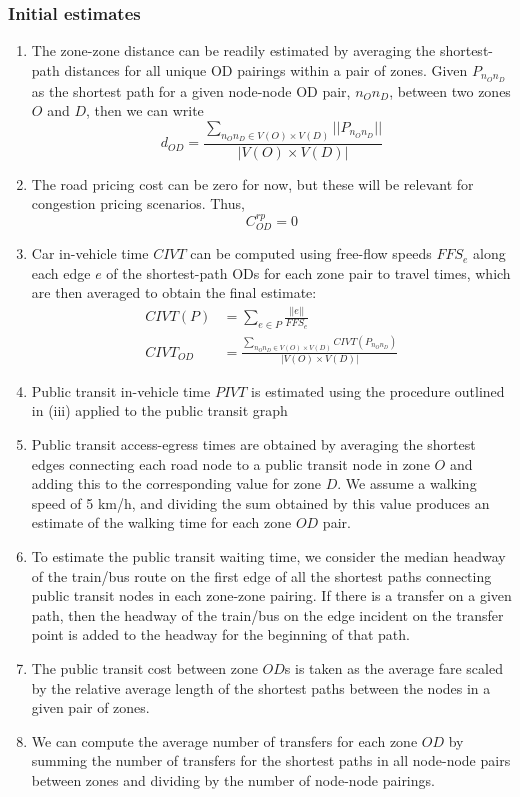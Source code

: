 \documentclass[11pt,twoside]{article}
\numberwithin{equation}{section}
\newcommand{\?}{\stackrel{?}{=}}
\newcommand{\fr}{\frac}
\begin{document}
\subsubsection{Initial estimates}
\begin{enumerate}
\item The zone-zone distance can be readily estimated by averaging the shortest-path distances for all unique OD pairings within a pair of zones. Given $P_{n_O n_D}$ as the shortest path for a given node-node OD pair, $n_On_D$, between two zones $O$ and $D$, then we can write
  \begin{equation}
    d_{OD} = \frac{\sum_{n_On_D \in V(O) \times V(D)}|| P_{n_On_D}||}{|V(O) \times V(D)|}
  \end{equation}
\item The road pricing cost can be zero for now, but these will be relevant for congestion pricing scenarios. Thus,
  \begin{equation}
    C^{rp}_{OD} = 0
  \end{equation}
\item Car in-vehicle time $CIVT$ can be computed using free-flow speeds $FFS_e$ along each edge $e$ of the shortest-path ODs for each zone pair to travel times, which are then averaged to obtain the final estimate:
  \begin{align}
    CIVT(P) &= \sum_{e \in P} \fr{||e||}{FFS_e}\\
    CIVT_{OD} &= \frac{\sum_{n_On_D \in V(O) \times V(D)} CIVT(P_{n_On_D})}{|V(O) \times V(D)|}
  \end{align}
\item Public transit in-vehicle time $PIVT$ is estimated using the procedure outlined in (iii) applied to the public transit graph
\item Public transit access-egress times are obtained by averaging the shortest edges connecting each road node to a public transit node in zone $O$ and adding this to the corresponding value for zone $D$. We assume a walking speed of 5 km/h, and dividing the sum obtained by this value produces an estimate of the walking time for each zone $OD$ pair.

\item To estimate the public transit waiting time, we consider the median headway of the train/bus route on the first edge of all the shortest paths connecting public transit nodes in each zone-zone pairing. If there is a transfer on a given path, then the headway of the train/bus on the edge incident on the transfer point is added to the headway for the beginning of that path.

\item The public transit cost between zone $OD$s is taken as the average fare scaled by the relative average length of the shortest paths between the nodes in a given pair of zones.

\item We can compute the average number of transfers for each zone $OD$ by summing the number of transfers for the shortest paths in all node-node pairs between zones and dividing by the number of node-node pairings.
\end{enumerate}
\end{document}
